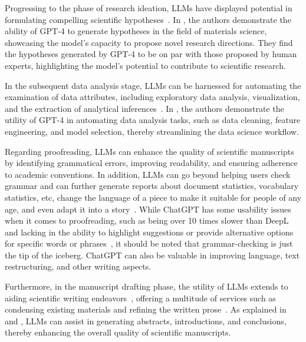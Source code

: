 Progressing to the phase of research ideation, LLMs have displayed potential in formulating compelling scientific hypotheses~\cite{park2023chatgpt}.
In \textcite{park2023chatgpt}, the authors demonstrate the ability of GPT-4 to generate hypotheses in the field of materials science, showcasing the model's capacity to propose novel research directions.
They find the hypotheses generated by GPT-4 to be on par with those proposed by human experts, highlighting the model's potential to contribute to scientific research.

In the subsequent data analysis stage, LLMs can be harnessed for automating the examination of data attributes, including exploratory data analysis, visualization, and the extraction of analytical inferences~\cite{cheng2023gpt4dataanalyst}.
In \textcite{hassan2023chatgptdatascientist}, the authors demonstrate the utility of GPT-4 in automating data analysis tasks, such as data cleaning, feature engineering, and model selection, thereby streamlining the data science workflow.

Regarding proofreading, LLMs can enhance the quality of scientific manuscripts by identifying grammatical errors, improving readability, and ensuring adherence to academic conventions.
In addition, LLMs can go beyond helping users check grammar and can further generate reports about document statistics, vocabulary statistics, etc, change the language of a piece to make it suitable for people of any age, and even adapt it into a story~\cite{kim2022replacegrammarly}.
While ChatGPT has some usability issues when it comes to proofreading, such as being over 10 times slower than DeepL and lacking in the ability to highlight suggestions or provide alternative options for specific words or phrases~\cite{maximov2023englishgrammar}, it should be noted that grammar-checking is just the tip of the iceberg.
ChatGPT can also be valuable in improving language, text restructuring, and other writing aspects.

Furthermore, in the manuscript drafting phase, the utility of LLMs extends to aiding scientific writing endeavors~\cite{alkaissi2023artificialhallucinations, azaria2023chatgptexperts}, offering a multitude of services such as condensing existing materials and refining the written prose~\cite{buruk2023academicwriting}.
As explained in \textcite{buruk2023academicwriting} and \textcite{alkaissi2023artificialhallucinations}, LLMs can assist in generating abstracts, introductions, and conclusions, thereby enhancing the overall quality of scientific manuscripts.

